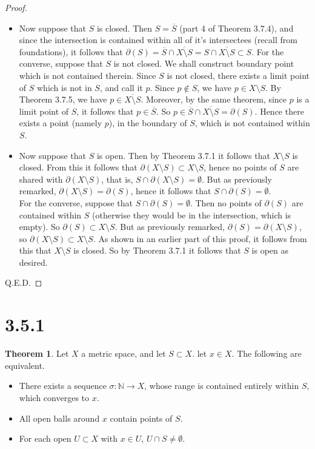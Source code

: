 \documentclass[11pt]{article}
\newcommand{\N}{\mathbb{N}}
\theoremstyle{definition}
\newtheorem{theorem}{Theorem}
\begin{document}
\begin{proof}
\begin{itemize}
\item 


Now suppose that $S$ is closed. Then $ S = \overline{S}$ (part 4 of Theorem 3.7.4), and since the intersection is contained within all of it's intersectees (recall from foundations), it follows that $\partial(S) = \overline{S} \cap \overline{X\setminus S} = S\cap \overline{X\setminus S} \subset S$. For the converse, suppose that $S$ is not closed. We shall construct boundary point which is not contained therein. Since $S$ is not closed, there exists a limit point of $S$ which is not in $S$, and call it $p$. Since $p\not\in S$, we have $p\in X\setminus S$. By Theorem 3.7.5, we have $p\in \overline{X\setminus S}$. Moreover, by the same theorem, since $p$ is a limit point of $S$, it follows that $p\in \overline{S}$. So $p\in \overline{S}\cap \overline{X\setminus S} = \partial(S)$. Hence there exists a point (namely $p$), in the boundary of $S$, which is not contained within $S$. 

\item 

Now suppose that $S$ is open. Then by Theorem 3.7.1 it follows that $X\setminus S$ is closed. From this it follows that $\partial(X\setminus S)\subset X\setminus S$, hence no points of $S$ are shared with $\partial(X\setminus S)$, that is, $S\cap \partial(X\setminus S) = \emptyset$. But as previously remarked, $\partial(X\setminus S) = \partial(S)$, hence it follows that $S\cap \partial(S) = \emptyset$.\\

For the converse, suppose that $S\cap\partial(S) = \emptyset$. Then no points of $\partial(S)$ are contained within $S$ (otherwise they would be in the intersection, which is empty). So $\partial(S)\subset X\setminus S$. But as previously remarked, $\partial(S) = \partial(X\setminus S) $, so $\partial(X\setminus S)\subset X\setminus S$. As shown in an earlier part of this proof, it follows from this that $X\setminus S$ is closed. So by Theorem 3.7.1 it follows that $S$ is open as desired.
\end{itemize}
Q.E.D.
\end{proof}


\section{3.5.1}

\begin{theorem}
Let $X$ a metric space, and let $S\subset X$. let $x\in X$. The following are equivalent.

\begin{itemize}
\item There exists a sequence $\sigma : \N\to X$, whose range is contained entirely within $S$, which converges to $x$. 
\item All open balls around $x$ contain points of $S$. 
\item For each open $U\subset X$ with $x\in U$, $U\cap S \ne \emptyset$.
\end{itemize}


\end{theorem}
\end{document}
